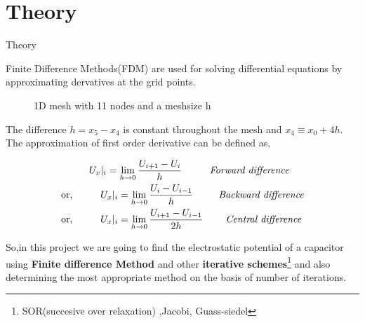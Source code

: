 \documentclass{beamer}
\begin{document}
\section{Theory}
\begin{frame}{Theory}

Finite Difference Methods(FDM) are used for solving differential equations by approximating dervatives at the grid points.
\begin{figure}[h]
\centering


\caption{\small 1D mesh with 11 nodes and a meshsize h}
\end{figure}
The difference $h = x_5 - x_4 $ is constant throughout the mesh and $x_4 \equiv x_0 + 4h$.\\

The approximation of first order derivative can be defined as,
{\raggedright 
\begin{align*}
    &\text{} \hspace{1cm} U_x|_i = \lim_{h \to 0} \frac{U_{i+1} - U_i}{h}  \hspace{10mm} \textit{Forward difference} \\
    &\text{or,} \hspace{1cm} U_x|_i = \lim_{h \to 0} \frac{U_{i} - U_{i-1}}{h}  \hspace{9mm} \textit{Backward  difference}\\
    &\text{or,} \hspace{1cm} U_x|_i = \lim_{h \to 0} \frac{U_{i+1} - U_{i-1}}{2h}   \hspace{8mm} \textit{Central difference}
\end{align*}
}
\end{frame}

\begin{frame}
So,in this project we are going to find the electrostatic potential of a capacitor using \textbf{Finite difference Method } and other \textbf{iterative schemes}\footnote{SOR(succesive over relaxation) ,Jacobi, Guass-siedel} and also determining the most appropriate method on the basis of number of iterations. \\

\end{frame}
\end{document}

